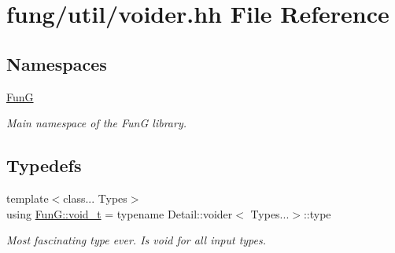 \hypertarget{voider_8hh}{}\section{fung/util/voider.hh File Reference}
\label{voider_8hh}
\subsection*{Namespaces}
\begin{DoxyCompactItemize}
\item 
 \hyperlink{namespaceFunG}{Fun\+G}
\begin{DoxyCompactList}\small\item\em Main namespace of the Fun\+G library. \end{DoxyCompactList}\end{DoxyCompactItemize}
\subsection*{Typedefs}
\begin{DoxyCompactItemize}
\item 
{\footnotesize template$<$class... Types$>$ }\\using \hyperlink{namespaceFunG_a0cde667596590eb8d32e4a5ee76ddbb9}{Fun\+G\+::void\+\_\+t} = typename Detail\+::voider$<$ Types...$>$\+::type
\begin{DoxyCompactList}\small\item\em Most fascinating type ever. Is void for all input types. \end{DoxyCompactList}\end{DoxyCompactItemize}
